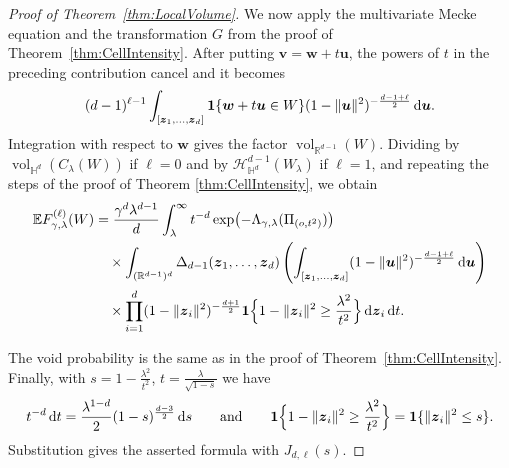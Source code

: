 \documentclass[11pt,a4paper]{article}
\theoremstyle{plain}
\theoremstyle{definition}
\theoremstyle{remark}
\newcommand{\dint}{\textup{d}}
\newcommand{\vol}{\mathop{\mathrm{vol}}\nolimits}
\newcommand{\bz}{\boldsymbol{z}}
\newcommand{\bu}{\boldsymbol{u}}
\newcommand{\bv}{\boldsymbol{v}}
\newcommand{\bw}{\boldsymbol{w}}
\def\EE{\mathbb{E}}
\def\HH{\mathbb{H}}
\def\RR{\mathbb{R}}
\def\cH{\mathcal{H}}
\begin{document}
\begin{proof}[Proof of Theorem~\ref{thm:LocalVolume}]
	We now apply the multivariate Mecke equation and the transformation $G$
	from the proof of Theorem~\ref{thm:CellIntensity}. After putting
	$\bv=\bw+t\bu$, the powers of $t$ in the preceding contribution
	cancel and it becomes
	\[
		(d-1)^{\ell-1}
		\int_{[\bz_1,\ldots,\bz_d]}
		{\bf 1}\{\bw+t\bu\in W\}
		(1-\|\bu\|^2)^{-\frac{d-1+\ell}{2}}
		\,\dint\bu.
	\]
	Integration with respect to $\bw$ gives the factor
	$\vol_{\RR^{d-1}}(W)$. Dividing by
	$\vol_{\HH^d}(C_\lambda(W))$ if $\ell=0$ and by
	$\cH_{\HH^d}^{d-1}(W_\lambda)$ if $\ell=1$, and repeating the steps of the proof of Theorem \ref{thm:CellIntensity}, we obtain
	\begin{align*}
		\EE F_{\gamma,\lambda}^{(\ell)}(W)
		 & =
		\frac{\gamma^d\lambda^{d-1}}{d}
		\int_\lambda^\infty
		t^{-d}
		\exp\bigl(
		-\Lambda_{\gamma,\lambda}(\Pi_{(o,t^2)})
		\bigr)         \\
		 & \quad\times
		\int_{(\RR^{d-1})^d}
		\Delta_{d-1}(\bz_1,\ldots,\bz_d)\left(
		\int_{[\bz_1,\ldots,\bz_d]}
			(1-\|\bu\|^2)^{-\frac{d-1+\ell}{2}}
		\,\dint\bu
		\right)
		\\
		 & \quad\times
		\prod_{i=1}^d
		(1-\|\bz_i\|^2)^{-\frac{d+1}{2}}
			{\bf 1}\Bigl\{
		1-\|\bz_i\|^2\ge\frac{\lambda^2}{t^2}
		\Bigr\}\,\dint\bz_i\,\dint t .
	\end{align*}

	The void probability is the same as in the proof of
	Theorem~\ref{thm:CellIntensity}. Finally, with $s=1-\frac{\lambda^2}{t^2}$, $t=\frac{\lambda}{\sqrt{1-s}}$
	we have
	\[
		t^{-d}\,\dint t
		=
		\frac{\lambda^{1-d}}{2}
		(1-s)^{\frac{d-3}{2}}\,\dint s
		\qquad\text{and}\qquad
		{\bf 1}\Bigl\{
		1-\|\bz_i\|^2\ge\frac{\lambda^2}{t^2}
		\Bigr\}
		=
		{\bf 1}\{\|\bz_i\|^2\le s\}.
	\]
	Substitution gives the asserted formula with $J_{d,\ell}(s)$.
\end{proof}
\end{document}

